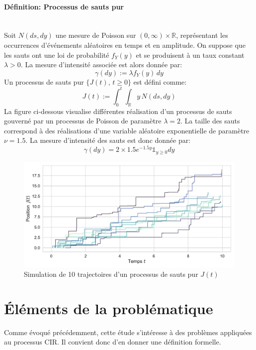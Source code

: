 \paragraph{Définition: Processus de sauts pur}\mbox{}\\
Soit \(N(ds,dy)\) une mesure de Poisson sur \((0, \infty) \times \mathds{R}\), représentant les occurrences d'événements aléatoires en temps et en amplitude. On suppose que les sauts ont une loi de probabilité \(f_Y(y)\) et se produisent à un taux constant \(\lambda > 0\). La mesure d'intensité associée est alors donnée par:
\[
\gamma(dy) := \lambda f_Y(y)\,dy
\]
Un processus de sauts pur \(\{J(t),\,t \geq 0\}\) est défini comme:
\begin{equation}\label{jump_def}
    J(t) := \int_0^t \int_{\mathds{R}} y\,N(ds,dy)
\end{equation}
La figure ci-dessous visualise différentes réalisation d'un processus de sauts gouverné par un processus de Poisson de paramètre $\lambda=2$. La taille des sauts correspond à des réalisations d'une variable aléatoire exponentielle de paramètre $\nu=1.5$. La mesure d'intensité des sauts est donc donnée par:
\[
\gamma(dy)=2\times1.5 e^{-1.5 y}\mathds{1}_{y\geq0}dy
\]
\begin{figure}[htb]
    \centering
    \includegraphics[width=0.9\linewidth]{img/intro/path_jump.pdf}
    \caption{Simulation de 10 trajectoires d'un processus de sauts pur $J(t)$}\label{fig:TrajJump}
\end{figure}
\FloatBarrier\clearpage

\section{Éléments de la problématique}  %

Comme évoqué précédemment, cette étude s'intéresse à des problèmes appliquées au processus \acl{CIR}. Il convient donc d'en donner une définition formelle.
